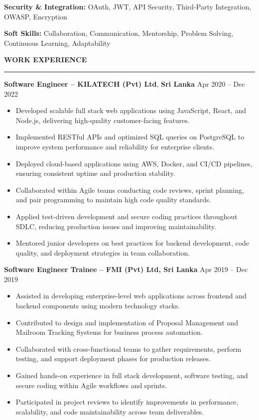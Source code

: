\documentclass[10pt,letterpaper]{article}
\begin{document}
\textbf{Security \& Integration:} OAuth, JWT, API Security, Third-Party Integration, OWASP, Encryption

\textbf{Soft Skills:} Collaboration, Communication, Mentorship, Problem Solving, Continuous Learning, Adaptability

\vspace{8pt}

\textbf{WORK EXPERIENCE}\\[-8pt]
\noindent\rule{\textwidth}{1pt}

\vspace{-2pt}

\textbf{Software Engineer -- KILATECH (Pvt) Ltd}, \textbf{Sri Lanka} \hfill Apr 2020 -- Dec 2022

\vspace{-1pt}

\begin{itemize}
\item Developed scalable full stack web applications using JavaScript, React, and Node.js, delivering high-quality customer-facing features.
\item Implemented RESTful APIs and optimized SQL queries on PostgreSQL to improve system performance and reliability for enterprise clients.
\item Deployed cloud-based applications using AWS, Docker, and CI/CD pipelines, ensuring consistent uptime and production stability.
\item Collaborated within Agile teams conducting code reviews, sprint planning, and pair programming to maintain high code quality standards.
\item Applied test-driven development and secure coding practices throughout SDLC, reducing production issues and improving maintainability.
\item Mentored junior developers on best practices for backend development, code quality, and deployment strategies in team collaboration.
\end{itemize}

\textbf{Software Engineer Trainee -- FMI (Pvt) Ltd, Sri Lanka} \hfill Apr 2019 -- Dec 2019

\vspace{-1pt}

\begin{itemize}
\item Assisted in developing enterprise-level web applications across frontend and backend components using modern technology stacks.
\item Contributed to design and implementation of Proposal Management and Mailroom Tracking Systems for business process automation.
\item Collaborated with cross-functional teams to gather requirements, perform testing, and support deployment phases for production releases.
\item Gained hands-on experience in full stack development, software testing, and secure coding within Agile workflows and sprints.
\item Participated in project reviews to identify improvements in performance, scalability, and code maintainability across team deliverables.
\end{itemize}
\end{document}
